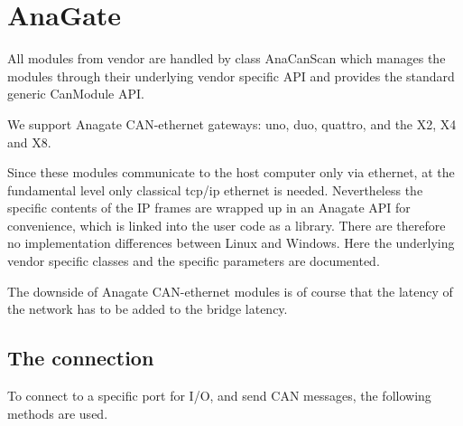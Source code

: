 \documentclass[letterpaper,10pt,english]{sphinxmanual}
\begin{document}
\begin{sphinxVerbatim}[commandchars=\\\{\}]
     
      
  
  
\end{sphinxVerbatim}


\chapter{AnaGate}
\label{\detokenize{vendors/anagate:anagate}}\label{\detokenize{vendors/anagate::doc}}
All modules from vendor {\hyperref[\detokenize{vendors/anagate:anagate}]{}} are handled by class AnaCanScan which manages the modules through their underlying vendor specific API and provides
the standard generic CanModule API.

We support Anagate CAN-ethernet gateways: uno, duo, quattro, and the X2, X4 and X8.

Since these modules communicate to the host computer only via ethernet, at the fundamental level only classical
tcp/ip ethernet is needed. Nevertheless the specific contents of the IP frames are wrapped up in an Anagate API for convenience, which is linked
into the user code as a library. There are therefore no implementation differences between Linux and Windows.
Here the underlying vendor specific classes and the specific parameters are documented.

The downside of Anagate CAN-ethernet modules is of course that the latency of the network has to be added to the bridge latency.


\section{The connection}
\label{\detokenize{vendors/anagate:the-connection}}
To connect to a specific port for I/O, and send CAN messages, the following methods are used.
\end{document}
